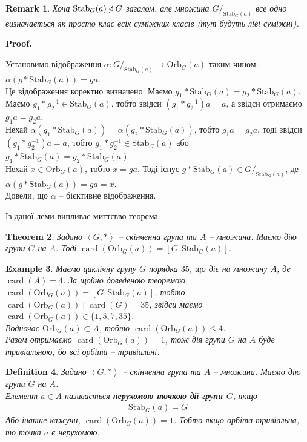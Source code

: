 \documentclass[a4paper, 10pt]{article}
\makeatletter
\theoremstyle{theoremdd}
\newtheorem{theorem}{Theorem}[subsection]
\theoremstyle{theoremdd}
\newtheorem{definition}[theorem]{Definition}
\theoremstyle{theoremdd}
\theoremstyle{theoremdd}
\theoremstyle{theoremdd}
\newtheorem{example}[theorem]{Example}
\theoremstyle{theoremdd}
\theoremstyle{theoremdd}
\theoremstyle{theoremdd}
\theoremstyle{theoremdd}
\theoremstyle{theoremdd}
\theoremstyle{theoremdd}
\newtheorem{remark}[theorem]{Remark}
\theoremstyle{theoremdd}
\theoremstyle{theoremdd}
\theoremstyle{theoremdd}
\theoremstyle{theoremdd}
\renewenvironment{proof}[1][Proof.\\]{\par
\pushQED{\hfill \qed}%
\normalfont \topsep6\p@\@plus6\p@\relax
\trivlist
\item\relax
{\bfseries
#1\@addpunct{.}}\hspace\labelsep\ignorespaces
}{%
\popQED\endtrivlist\@endpefalse
}
\DeclareMathOperator{\card}{card}
\newcommand\Orb{\text{Orb}}
\newcommand\Stab{\text{Stab}}
\makeatother
\begin{document}
\begin{remark}
Хоча $\Stab_G(a) \centernot\triangleleft G$ загалом, але множина $G/_{\Stab_G(a)}$ все одно визначається як просто клас всіх суміжних класів (тут будуть ліві суміжні).
\end{remark}

\begin{proof}
Установимо відображення $\alpha \colon G/_{\Stab_G(a)} \to \Orb_G(a)$ таким чином: $\alpha(g*\Stab_G(a)) = ga$.\\
Це відображення коректно визначено. Маємо $g_1*\Stab_G(a) = g_2*\Stab_G(a)$. Маємо $g_1*g_2^{-1} \in \Stab_G(a)$, тобто звідси $(g_1*g_2^{-1})a = a$, а звідси отримаємо $g_1a = g_2a$.\\
Нехай $\alpha(g_1*\Stab_G(a)) = \alpha(g_2*\Stab_G(a))$, тобто $g_1a = g_2a$, тоді звідси $(g_1*g_2^{-1})a = a$, тобто $g_1*g_2^{-1} \in \Stab_G(a)$ або $g_1*\Stab_G(a) = g_2*\Stab_G(a)$.\\
Нехай $x \in \Orb_G(a)$, тобто $x = ga$. Тоді існує $g*\Stab_G(a) \in G/_{\Stab_G(a)}$, де $\alpha(g*\Stab_G(a)) = ga = x$.\\
Довели, що $\alpha$ -- бієктивне відображення.
\end{proof}

Із даної леми випливає миттєвво теорема:

\begin{theorem}
Задано $\left<G,*\right>$ -- скінченна група та $A$ -- множина. Маємо дію групи $G$ на $A$. Тоді $\card(\Orb_G(a)) = [G:\Stab_G(a)]$.
\end{theorem}

\begin{example}
Маємо циклічну групу $G$ порядка $35$, що діє на множину $A$, де $\card(A) = 4$. За щойно доведеною теоремою, $\card(\Orb_G(a)) = [G : \Stab_G(a)]$, тобто $\card(\Orb_G(a)) \mid \card(G) = 35$, звідси маємо $\card(\Orb_G(a)) \in \{1,5,7,35\}$.\\
Водночас $\Orb_G(a) \subset A$, тобто $\card(\Orb_G(a)) \leq 4$.\\
Разом отримаємо $\card(\Orb_G(a)) = 1$, тож дія групи $G$ на $A$ буде тривіальною, бо всі орбіти -- тривіальні. 
\end{example}

\begin{definition}
Задано $\left<G,*\right>$ -- скінченна група та $A$ -- множина. Маємо дію групи $G$ на $A$.\\
Елемент $a \in A$ називається \textbf{нерухомою точкою дії групи $G$}, якщо
\begin{align*}
\Stab_G(a) = G
\end{align*}
Або інакше кажучи, $\card(\Orb_G(a)) = 1$. Тобто якщо орбіта тривіальна, то точка $a$ є нерухомою.
\end{definition}
\end{document}
